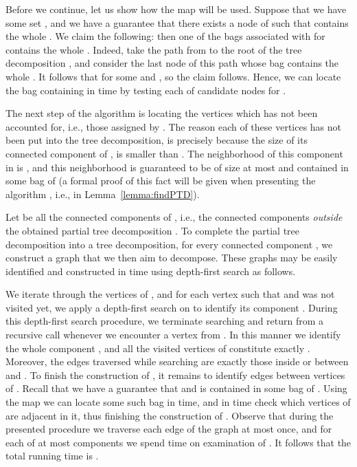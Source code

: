 \documentclass[a4paper,11pt]{article}
\theoremstyle{definition}
\theoremstyle{remark}
\begin{document}
Before we continue, let us show how the map  will be used.
Suppose that we have some set , and we have a guarantee
that there exists a node  of  such that  contains the
whole .  We claim the following: then one of the bags associated
with  for  contains the whole .  Indeed, take the
path from  to the root of the tree decomposition , and
consider the last node  of this path whose bag contains the whole
.  It follows that  for some  and , so the claim follows.  Hence, we can locate the bag
containing  in  time by testing each of 
candidate nodes  for .

The next step of the algorithm is locating the vertices which has not
been accounted for, i.e., those assigned  by .  The
reason each of these vertices has not been put into the tree
decomposition, is precisely because the size of its connected
component  of , is smaller than .  The
neighborhood of this component in  is , and this neighborhood
is guaranteed to be of size at most  and contained in some bag
of  (a formal proof of this fact will be given when presenting
the algorithm , i.e., in Lemma~\ref{lemma:findPTD}).

Let  be all the connected components of ,
i.e., the connected components \emph{outside} the obtained partial
tree decomposition .  To complete the partial tree decomposition
into a tree decomposition, for every connected component , we
construct a graph  that we then aim to
decompose.  These graphs may be easily identified and constructed in
 time using depth-first search as follows.

We iterate through the vertices of , and for each vertex  such
that  and  was not visited yet, we apply a
depth-first search on  to identify its component .  During this
depth-first search procedure, we terminate searching and return from a
recursive call whenever we encounter a vertex from .  In this
manner we identify the whole component , and all the visited
vertices of  constitute exactly .  Moreover, the edges
traversed while searching are exactly those inside  or between 
and .  To finish the construction of , it remains to
identify edges between vertices of .  Recall that we have a
guarantee that  and  is contained in some bag
of .  Using the map  we can locate some such bag in
 time, and in  time check which vertices of
 are adjacent in it, thus finishing the construction of .
Observe that during the presented procedure we traverse each edge of
the graph at most once, and for each of at most  components  we
spend  time on examination of .  It follows that
the total running time is .
\end{document}
